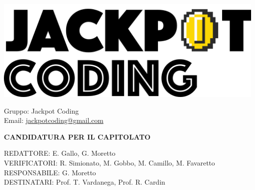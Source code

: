 \documentclass[5pt]{article}
\begin{document}
\begin{minipage}[t]{0.50\textwidth}
    \begin{flushleft}
        \hspace{10pt}
        \includegraphics[scale=0.65]{jackpot-logo.png} 
    \end{flushleft}
\end{minipage}
\hspace{-60pt} %
\begin{flushright}
    \begin{minipage}[t]{0.50\textwidth}
        \begin{flushright}
            Gruppo: {\Large Jackpot Coding}\\
            Email: \href{mailto:jackpotcoding@gmail.com}{jackpotcoding@gmail.com}
        \end{flushright}
    \end{minipage}
\end{flushright}

\vspace{24pt}

\begin{center}
    \textbf{\LARGE CANDIDATURA PER IL CAPITOLATO}
\end{center}

\vspace{13pt}

\begin{flushleft}
    \begin{spacing}{1.5}
        REDATTORE: E. Gallo, G. Moretto\\%
        VERIFICATORI: R. Simionato, M. Gobbo, M. Camillo, M. Favaretto \\
        RESPONSABILE: G. Moretto\\%
        \vspace{7pt}
        DESTINATARI: Prof. T. Vardanega, Prof. R. Cardin\\%
    \end{spacing}
\end{flushleft}
\end{document}

